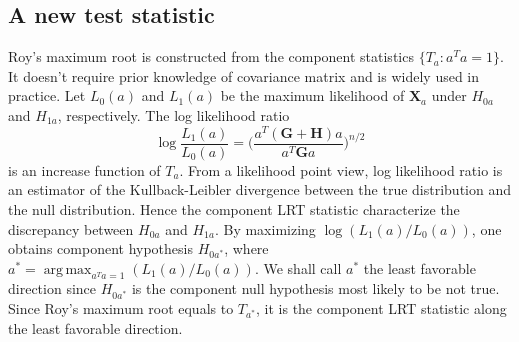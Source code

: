 \documentclass[12pt]{article} %
\DeclareMathOperator*{\argmax}{arg\,max}
\newcommand{\bX}{\mathbf{X}}
\newcommand{\bH}{\mathbf{H}}
\newcommand{\bG}{\mathbf{G}}
\theoremstyle{definition}
\begin{document}
\subsection{A new test statistic}

Roy's maximum root is constructed from the component statistics $\{T_a :a^T a=1\}$. 
It doesn't require prior knowledge of covariance matrix and is widely used in practice.
Let $L_0(a)$ and $L_1(a)$ be the maximum likelihood of $\bX_a$ under $H_{0a}$ and $H_{1a}$, respectively.
The log likelihood ratio 
$$\log \frac{L_1(a)}{L_0(a)}=\Big(\frac{a^T(\bG+\bH) a}{a^T \bG a}\Big)^{n/2}$$
is an increase function of $T_a$.
From a likelihood point view, log likelihood ratio is an estimator of the Kullback-Leibler divergence between the true distribution and the null distribution.
Hence the component LRT statistic characterize the discrepancy between  $H_{0a}$ and $H_{1a}$.
By maximizing $\log (L_1(a)/L_0 (a))$, 
one obtains component hypothesis $H_{0a^*}$, where $a^*=\argmax_{a^T a=1}(L_1(a)/L_0(a))$. 
We shall call $a^*$ the least favorable direction %
since $H_{0a^*}$ is the component null hypothesis most likely to be not true.
Since Roy's maximum root equals to $T_{a^*}$, it is the component LRT statistic along the least favorable direction.




\end{document}
